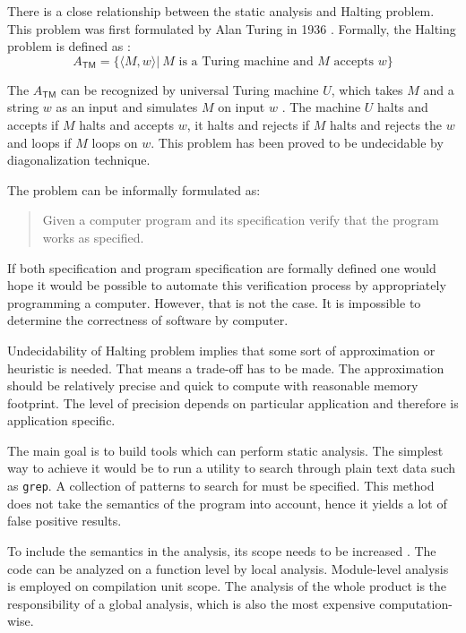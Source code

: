 \documentclass[12pt,final,oneside]{fithesis2}
\theoremstyle{definition}
\begin{document}
There is a close relationship between the static analysis and Halting
problem. This problem was first formulated by Alan Turing in 1936
\cite{Turing36-1}. Formally, the Halting problem is defined as
\cite{Sipser06-1}:
\begin{equation*}
A_{\mathsf{TM}} = \{ \langle M, w \rangle |
  \: M \text{ is a Turing machine and } M \text{ accepts } w \}
\end{equation*}

The $A_{\mathsf{TM}}$ can be recognized by universal Turing machine
$U$, which takes $M$ and a string $w$ as an input and simulates $M$ on input
$w$ \cite{Kozen97-1}. The machine $U$ halts and accepts if $M$ halts and
accepts $w$, it halts and rejects if $M$ halts and rejects the $w$ and loops
if $M$ loops on $w$. This problem has been proved to be undecidable by
diagonalization technique.

The problem can be informally formulated as:

\begin{quote}

Given a computer program and its specification verify that the program
works as specified.

\end{quote}

If both specification and program specification are formally defined one
would hope it would be possible to automate this verification process by
appropriately programming a computer. However, that is not the case.
It is impossible to determine the correctness of software by computer.

Undecidability of Halting problem implies that some sort of approximation
or heuristic is needed. That means a trade-off has to be made. The
approximation should be relatively precise and quick to compute with
reasonable memory footprint. The level of precision depends on particular
application and therefore is application specific.

The main goal is to build tools which can perform static analysis. The
simplest way to achieve it would be to run a utility to search through
plain text data such as \texttt{grep}. A collection of patterns to search
for must be specified. This method does not take the semantics of the
program into account, hence it yields a lot of false positive results.

To include the semantics in the analysis, its scope needs to be increased
\cite{Chess04-1}. The code can be analyzed on a function level by local
analysis. Module-level analysis is employed on compilation unit scope.
The analysis of the whole product is the responsibility of a global analysis,
which is also the most expensive computation-wise.
\end{document}

